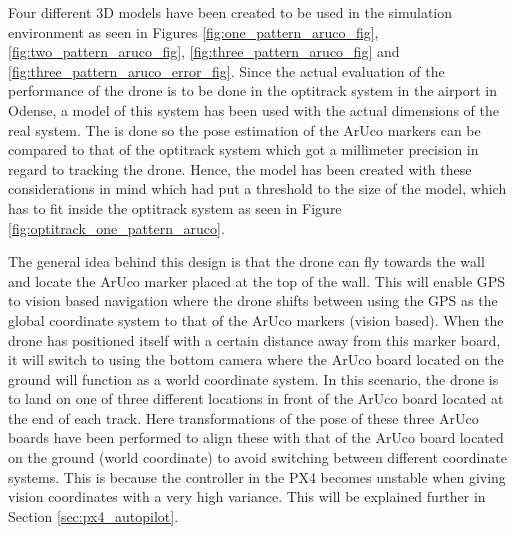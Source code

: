 \documentclass[../Head/report.tex]{subfiles}
\begin{document}
Four different 3D models have been created to be used in the simulation environment as seen in Figures \ref{fig:one_pattern_aruco_fig}, \ref{fig:two_pattern_aruco_fig}, \ref{fig:three_pattern_aruco_fig} and \ref{fig:three_pattern_aruco_error_fig}. Since the actual evaluation of the performance of the drone is to be done in the optitrack system in the airport in Odense, a model of this system has been used with the actual dimensions of the real system. The is done so the pose estimation of the    ArUco markers can be compared to that of the optitrack system which got a millimeter precision in regard to tracking the drone. Hence, the model has been created with these considerations in mind which had put a threshold to the size of the model, which has to fit inside the optitrack system as seen in Figure \ref{fig:optitrack_one_pattern_aruco}. 

The general idea behind this design is that the drone can fly towards the wall and locate the ArUco marker placed at the top of the wall. This will enable GPS to vision based navigation where the drone shifts between using the GPS as the global coordinate system to that of the ArUco markers (vision based). When the drone has positioned itself with a certain distance away from this marker board, it will switch to using the bottom camera where the ArUco board located on the ground will function as a  world coordinate system. In this scenario, the drone is to land on one of three different locations in front of the ArUco board located at the end of each track. Here transformations of the pose of these three ArUco boards have been performed to align these with that of the ArUco board located on the ground (world coordinate) to avoid switching between different coordinate systems. This is because the controller in the PX4 becomes unstable when giving vision coordinates with a very high variance. This will be explained further in Section \ref{sec:px4_autopilot}. 
\end{document}
